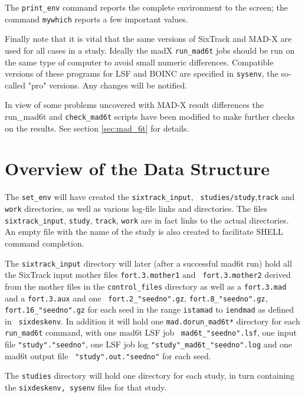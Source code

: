 \documentclass{cernatsnote}
\begin{document}
The \texttt{print\_env} command reports the complete environment to the screen;
the command \texttt{mywhich} reports a few important values.

Finally note that it is vital that the same versions of SixTrack and MAD-X are
used for all cases in a study. Ideally the madX \texttt{run\_mad6t} jobs should
be run on the same type of computer to avoid small numeric differences.
Compatible versions of these programs for LSF and BOINC are specified
in \texttt{sysenv}, the so-called "pro" versions. Any changes will be notified.

In view of some problems uncovered with MAD-X result differences the run_mad6t
and {\tt check\_mad6t} scripts have been modified to make further checks on
the results. See section \ref{sec:mad_6t} for details.

\section{Overview of the Data Structure}

The \texttt{set\_env} will have created the \texttt{sixtrack\_input}, {\tt
studies/study},\texttt{track} and \texttt{work} directories, as well as various
log-file links and directories.  The files \texttt{sixtrack\_input}, \texttt{study},
\texttt{track}, \texttt{work} are in fact links to the actual directories. An empty
file with the name of the study is also created to facilitate SHELL command
completion.

The \texttt{sixtrack\_input} directory will later (after a successful mad6t run)
hold all the SixTrack input mother files \texttt{fort.3.mother1} and {\tt
fort.3.mother2} derived from the mother files in the \texttt{control\_files}
directory as well as a \texttt{fort.3.mad} and a \texttt{fort.3.aux} and one {\tt
fort.2\_"seedno".gz}, \texttt{fort.8\_"seedno".gz}, \texttt{fort.16\_"seedno".gz} for
each seed in the range \texttt{istamad} to \texttt{iendmad} as defined in {\tt
sixdeskenv}. In addition it will hold one \texttt{mad.dorun\_mad6t*} directory for
each \texttt{run\_mad6t} command, with one mad6t LSF job {\tt
mad6t\_"seedno".lsf}, one input file \texttt{"study"."seedno"}, one LSF job log
\texttt{"study"\_mad6t\_"seedno".log} and one mad6t output file {\tt
"study".out."seedno"} for each seed.

The \texttt{studies} directory will hold one directory for each study, in turn
containing the \texttt{sixdeskenv, sysenv} files for that study.
\end{document}
